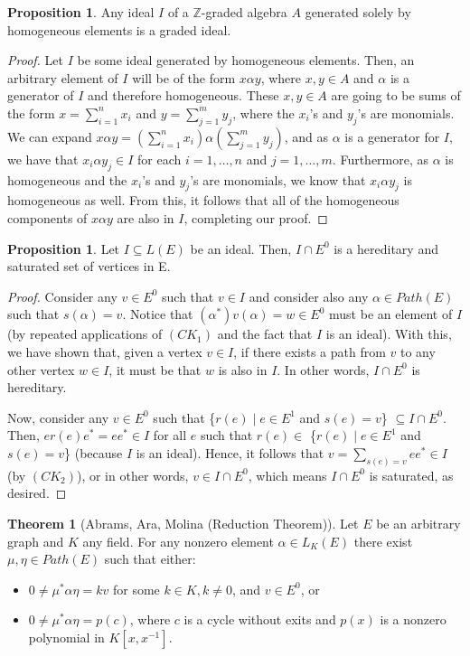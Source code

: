 \documentclass[12pt]{amsart}
\theoremstyle{plain} \numberwithin{equation}{section}
\theoremstyle{definition}
\newtheorem{proposition}[theorem]{Proposition}
\newtheorem{thm}{Theorem}
\theoremstyle{definition}
\begin{document}
\begin{proposition}
    Any ideal $I$ of a $\mathbb{Z}$-graded algebra $A$ generated solely by homogeneous elements is a graded ideal.
\end{proposition}
\begin{proof}
    Let $I$ be some ideal generated by homogeneous elements. Then, an arbitrary element of $I$ will be of the form $x\alpha y$, where $x,y\in A$ and $\alpha$ is a generator of $I$ and therefore homogeneous. These $x,y\in A$ are going to be sums of the form $x = \sum_{i=1}^n x_i$ and $y = \sum_{j=1}^m y_j$, where the $x_i$'s and $y_j$'s are monomials. We can expand $x\alpha y = (\sum_{i=1}^n x_i)\alpha(\sum_{j=1}^m y_j)$, and as $\alpha$ is a generator for $I$, we have that $x_i\alpha y_j \in I$ for each $i = 1,\dots ,n$ and $j = 1,\dots ,m$. Furthermore, as $\alpha$ is homogeneous and the $x_i$'s and $y_j$'s are monomials, we know that $x_i\alpha y_j$ is homogeneous as well. From this, it follows that all of the homogeneous components of $x\alpha y$ are also in $I$, completing our proof.
\end{proof}

\begin{proposition} Let $I \subseteq L(E)$ be an ideal. Then, $I \cap E^0$ is a hereditary and saturated set of vertices in E. 
\end{proposition}
\begin{proof}
    Consider any $v\in E^0$ such that $v\in I$ and consider also any $\alpha \in Path(E)$ such that $s(\alpha) = v$. Notice that $(\alpha ^*)v(\alpha) = w \in E^0$ must be an element of $I$ (by repeated applications of $(CK_1)$ and the fact that $I$ is an ideal). With this, we have shown that, given a vertex $v\in I$, if there exists a path from $v$ to any other vertex $w\in I$, it must be that $w$ is also in $I$. In other words, $I\cap E^0$ is hereditary.
    
    Now, consider any $v\in E^0$ such that \{$r(e) \mid e\in E^1$ and $s(e) = v$\} $\subseteq I\cap E^0$. Then, $er(e)e^* = ee^*\in I$ for all $e$ such that $r(e) \in$ \{$r(e) \mid e\in E^1$ and $s(e) = v$\} (because $I$ is an ideal). Hence, it follows that $v = \sum_{s(e)=v} ee^* \in I$ (by $(CK_2)$), or in other words, $v\in I\cap E^0$, which means $I\cap E^0$ is saturated, as desired.
\end{proof}

\begin{thm} [Abrams, Ara, Molina (Reduction Theorem)]
    Let $E$ be an arbitrary graph and $K$ any field. For any nonzero element $\alpha\in L_K(E)$ there exist $\mu,\eta\in Path(E)$ such that either:
    \begin{itemize}
        \item [($i$)] $0\neq\mu^*\alpha\eta = kv$ for some $k\in K, k\neq0$, and $v\in E^0$, or
        \item [($ii$)] $0\neq\mu^*\alpha\eta = p(c)$, where $c$ is a cycle without exits and $p(x)$ is a nonzero polynomial in $K[x,x^{-1}]$.
    \end{itemize}
\end{thm}
\end{document}
